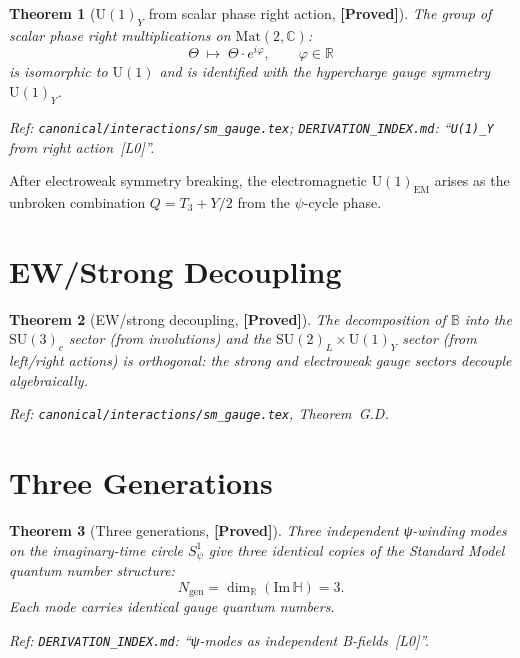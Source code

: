 \documentclass[12pt,a4paper]{article}
\newtheorem{theorem}{Theorem}[section]
\theoremstyle{definition}
\theoremstyle{remark}
\newcommand{\PROVED}{\textbf{[Proved]}}
\newcommand{\SU}[1]{\mathrm{SU}(#1)}
\newcommand{\UU}[1]{\mathrm{U}(#1)}
\begin{document}
\begin{theorem}[$\UU{1}_Y$ from scalar phase right action, \PROVED]
\label{thm:u1}
The group of scalar phase right multiplications on $\mathrm{Mat}(2,\mathbb{C})$:
\[
  \Theta \;\mapsto\; \Theta\cdot e^{i\varphi}, \qquad \varphi\in\mathbb{R}
\]
is isomorphic to $\UU{1}$ and is identified with the hypercharge gauge symmetry
$\UU{1}_Y$.

Ref: \texttt{canonical/interactions/sm\_gauge.tex};
\texttt{DERIVATION\_INDEX.md}: ``\texttt{U(1)\_Y} from right action~[L0]''.
\end{theorem}

After electroweak symmetry breaking, the electromagnetic $\UU{1}_{\mathrm{EM}}$
arises as the unbroken combination $Q = T_3 + Y/2$ from the $\psi$-cycle phase.

\section{EW/Strong Decoupling}
\label{sec:decoupling}

\begin{theorem}[EW/strong decoupling, \PROVED]
\label{thm:decoupling}
The decomposition of $\mathbb{B}$ into the $\SU{3}_c$ sector (from involutions)
and the $\SU{2}_L\times\UU{1}_Y$ sector (from left/right actions) is orthogonal:
the strong and electroweak gauge sectors decouple algebraically.

Ref: \texttt{canonical/interactions/sm\_gauge.tex}, Theorem~G.D.
\end{theorem}

\section{Three Generations}
\label{sec:generations}

\begin{theorem}[Three generations, \PROVED]
\label{thm:generations}
Three independent ψ-winding modes on the imaginary-time circle $S^1_\psi$
give three identical copies of the Standard Model quantum number structure:
\[
  N_{\mathrm{gen}} = \dim_{\mathbb{R}}(\mathrm{Im}\,\mathbb{H}) = 3.
\]
Each mode carries identical gauge quantum numbers.

Ref: \texttt{DERIVATION\_INDEX.md}: ``ψ-modes as independent B-fields~[L0]''.
\end{theorem}
\end{document}

